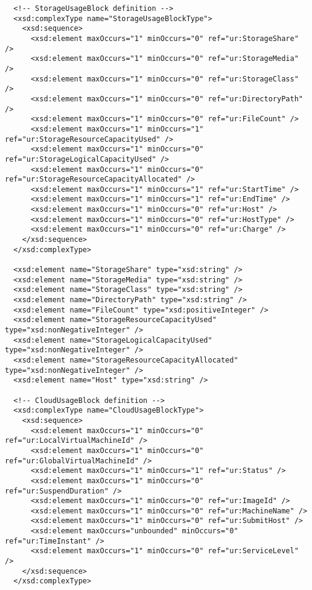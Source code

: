 \begin{verbatim}
  <!-- StorageUsageBlock definition -->
  <xsd:complexType name="StorageUsageBlockType">
    <xsd:sequence>
      <xsd:element maxOccurs="1" minOccurs="0" ref="ur:StorageShare" />
      <xsd:element maxOccurs="1" minOccurs="0" ref="ur:StorageMedia" />
      <xsd:element maxOccurs="1" minOccurs="0" ref="ur:StorageClass" />
      <xsd:element maxOccurs="1" minOccurs="0" ref="ur:DirectoryPath" />
      <xsd:element maxOccurs="1" minOccurs="0" ref="ur:FileCount" />
      <xsd:element maxOccurs="1" minOccurs="1" ref="ur:StorageResourceCapacityUsed" />
      <xsd:element maxOccurs="1" minOccurs="0" ref="ur:StorageLogicalCapacityUsed" />
      <xsd:element maxOccurs="1" minOccurs="0" ref="ur:StorageResourceCapacityAllocated" />
      <xsd:element maxOccurs="1" minOccurs="1" ref="ur:StartTime" />
      <xsd:element maxOccurs="1" minOccurs="1" ref="ur:EndTime" />
      <xsd:element maxOccurs="1" minOccurs="0" ref="ur:Host" />
      <xsd:element maxOccurs="1" minOccurs="0" ref="ur:HostType" />
      <xsd:element maxOccurs="1" minOccurs="0" ref="ur:Charge" />
    </xsd:sequence>
  </xsd:complexType>

  <xsd:element name="StorageShare" type="xsd:string" />
  <xsd:element name="StorageMedia" type="xsd:string" />
  <xsd:element name="StorageClass" type="xsd:string" />
  <xsd:element name="DirectoryPath" type="xsd:string" />
  <xsd:element name="FileCount" type="xsd:positiveInteger" />
  <xsd:element name="StorageResourceCapacityUsed" type="xsd:nonNegativeInteger" />
  <xsd:element name="StorageLogicalCapacityUsed" type="xsd:nonNegativeInteger" />
  <xsd:element name="StorageResourceCapacityAllocated" type="xsd:nonNegativeInteger" />
  <xsd:element name="Host" type="xsd:string" />

  <!-- CloudUsageBlock definition -->
  <xsd:complexType name="CloudUsageBlockType">
    <xsd:sequence>
      <xsd:element maxOccurs="1" minOccurs="0" ref="ur:LocalVirtualMachineId" />
      <xsd:element maxOccurs="1" minOccurs="0" ref="ur:GlobalVirtualMachineId" />
      <xsd:element maxOccurs="1" minOccurs="1" ref="ur:Status" />
      <xsd:element maxOccurs="1" minOccurs="0" ref="ur:SuspendDuration" />
      <xsd:element maxOccurs="1" minOccurs="0" ref="ur:ImageId" />
      <xsd:element maxOccurs="1" minOccurs="0" ref="ur:MachineName" />
      <xsd:element maxOccurs="1" minOccurs="0" ref="ur:SubmitHost" />
      <xsd:element maxOccurs="unbounded" minOccurs="0" ref="ur:TimeInstant" />
      <xsd:element maxOccurs="1" minOccurs="0" ref="ur:ServiceLevel" />
    </xsd:sequence>
  </xsd:complexType>


\end{verbatim}
